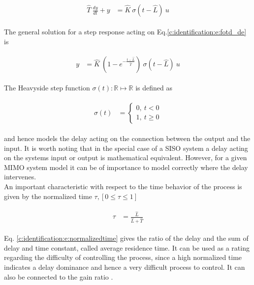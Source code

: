 \begin{align}
\begin{split}
\hat{T}~\frac{dy}{dt} + y &= \hat{K} ~\sigma(t-\hat{L})~u
\end{split}
\label{c:identification:e:fotd_de}
\end{align}

The general solution for a step response acting on Eq.\ref{c:identification:e:fotd_de} is 

\begin{align}
\begin{split}
y &= \hat{K} ~\left( 1 - e^{-\frac{t- \hat{L}}{\hat{T}}}\right)~ \sigma(t-\hat{L}) ~u
\end{split}
\label{c:identification:e:fodt_dt}
\end{align}

The Heavyside step function $\sigma(t): \mathbb{R} \mapsto \mathbb{R}$ is defined as

\begin{align}
\begin{split}
\sigma(t) &= \begin{cases} 
      0 , ~t < 0 \\
      1, ~t \geq 0
   \end{cases}
\end{split}
\label{c:identificitaion:e:heavyside}
\end{align}

and hence models the delay acting on the connection between the output and the input. It is worth noting that in the special case of a SISO system a delay acting on the systems input or output is mathematical equivalent. However, for a given MIMO system model it can be of importance to model correctly where the delay intervenes. \\

An important characteristic with respect to the time behavior of the process is given by the normalized time $\tau, \left[0 \leq \tau \leq 1 \right] $ \cite[p.16]{Astrom1995}

\begin{align}
\begin{split}
\tau &= \frac{\hat{L}}{\hat{L}+\hat{T}}
\end{split}
\label{c:identification:e:normalizedtime}
\end{align}

Eq. \ref{c:identification:e:normalizedtime} gives the ratio of the delay and the sum of delay and time constant, called average residence time. It can be used as a rating regarding the difficulty of controlling the process, since a high normalized time indicates a delay dominance and hence a very difficult process to control. It can also be connected to the gain ratio \cite[p.27]{Astrom2006}.\\

